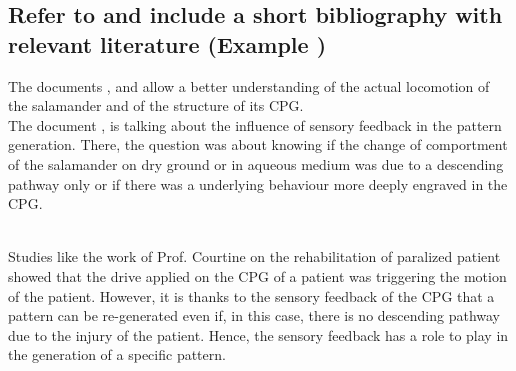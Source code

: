\documentclass{cmc}
\begin{document}
\subsection{Refer to and include a short bibliography with relevant
  literature (Example \cite{ijspeert2007swimming})}


The documents \cite{ijspeert2007swimming}, \cite{Crespi2013} and \cite{Karakasiliotis2013} allow a better understanding of the actual locomotion of the salamander and of the structure of its CPG.\\
The document \cite{Ijspeert2013}, is talking about the influence of sensory feedback in the pattern generation. There, the question was about knowing  if the change of comportment of the salamander on dry ground or in aqueous medium was due to a descending pathway only or if there was a underlying behaviour more deeply engraved in the CPG.

\\
Studies like the work of Prof. Courtine \cite{Courtine:262728} on the rehabilitation of paralized patient showed that the drive applied on the CPG of a patient was triggering the motion of the patient. However, it is thanks to the sensory feedback of the CPG that a pattern can be re-generated even if, in this case, there is no descending pathway due to the injury of the patient. Hence, the sensory feedback has a role to play in the generation of a specific pattern.
\nocite{*}






\end{document}
